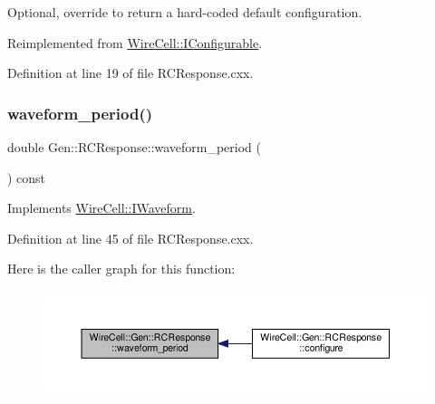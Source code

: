 Optional, override to return a hard-\/coded default configuration. 



Reimplemented from \hyperlink{class_wire_cell_1_1_i_configurable_a54841b2da3d1ea02189478bff96f7998}{Wire\+Cell\+::\+I\+Configurable}.



Definition at line 19 of file R\+C\+Response.\+cxx.

\mbox{\label{class_wire_cell_1_1_gen_1_1_r_c_response_a866c57fca71207b5d32b8e68b467a965}} 
\subsubsection{\texorpdfstring{waveform\+\_\+period()}{waveform\_period()}}
{\footnotesize\ttfamily double Gen\+::\+R\+C\+Response\+::waveform\+\_\+period (\begin{DoxyParamCaption}{ }\end{DoxyParamCaption}) const\hspace{0.3cm}{\ttfamily [virtual]}}



Implements \hyperlink{class_wire_cell_1_1_i_waveform_a0d5d0cd99b8a4e49d5d8b633150b707a}{Wire\+Cell\+::\+I\+Waveform}.



Definition at line 45 of file R\+C\+Response.\+cxx.

Here is the caller graph for this function\+:
\nopagebreak
\begin{figure}[H]
\begin{center}
\leavevmode
\includegraphics[width=350pt]{class_wire_cell_1_1_gen_1_1_r_c_response_a866c57fca71207b5d32b8e68b467a965_icgraph}
\end{center}
\end{figure}
\mbox{\label{class_wire_cell_1_1_gen_1_1_r_c_response_ac51bbb2238729a224d49dc513b02a16e}} 
